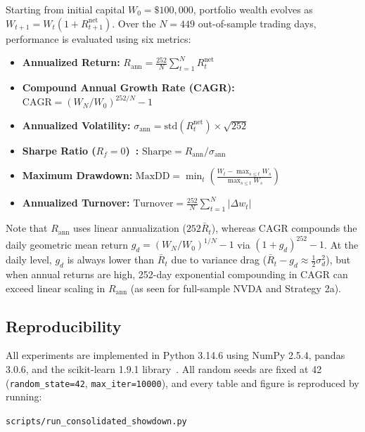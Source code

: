 \documentclass[11pt, a4paper]{article}
\begin{document}
Starting from initial capital $W_0 = \$100,000$, portfolio wealth evolves as $W_{t+1} = W_t (1 + R_{t+1}^{\text{net}})$. Over the $N = 449$ out-of-sample trading days, performance is evaluated using six metrics:
\begin{itemize}
    \item \textbf{Annualized Return:} $R_{\text{ann}} = \frac{252}{N} \sum_{t=1}^{N} R_t^{\text{net}}$
    \item \textbf{Compound Annual Growth Rate (CAGR):} $\text{CAGR} = \left(W_N / W_0\right)^{252/N} - 1$
    \item \textbf{Annualized Volatility:} $\sigma_{\text{ann}} = \text{std}(R_t^{\text{net}}) \times \sqrt{252}$
    \item \textbf{Sharpe Ratio ($R_f = 0$)~\cite{sharpe1994}:} $\text{Sharpe} = R_{\text{ann}} / \sigma_{\text{ann}}$
    \item \textbf{Maximum Drawdown:} $\text{MaxDD} = \min_{t} \left( \frac{W_t - \max_{s \le t} W_s}{\max_{s \le t} W_s} \right)$
    \item \textbf{Annualized Turnover:} $\text{Turnover} = \frac{252}{N} \sum_{t=1}^{N} |\Delta w_t|$
\end{itemize}
Note that $R_{\text{ann}}$ uses linear annualization ($252 \bar{R}_t$), whereas $\text{CAGR}$ compounds the daily geometric mean return $g_d = (W_N/W_0)^{1/N}-1$ via $(1+g_d)^{252}-1$. At the daily level, $g_d$ is always lower than $\bar{R}_t$ due to variance drag ($\bar{R}_t - g_d \approx \frac{1}{2}\sigma_d^2$), but when annual returns are high, 252-day exponential compounding in $\text{CAGR}$ can exceed linear scaling in $R_{\text{ann}}$ (as seen for full-sample NVDA and Strategy 2a).

\subsection{Reproducibility}
\label{sec:repro}
All experiments are implemented in Python 3.14.6 using NumPy 2.5.4, pandas 3.0.6, and the scikit-learn 1.9.1 library~\cite{pedregosa2011}. All random seeds are fixed at 42 (\texttt{random\_state=42}, \texttt{max\_iter=10000}), and every table and figure is reproduced by running:
\begin{center}
\texttt{scripts/run\_consolidated\_showdown.py}
\end{center}

\end{document}
